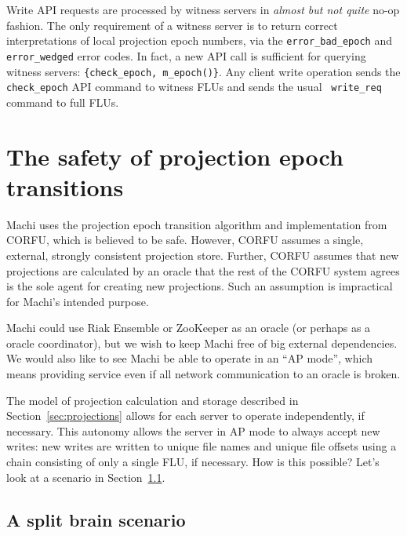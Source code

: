 \documentclass[preprint,10pt]{sigplanconf}
\begin{document}
Write API requests are processed by witness servers in {\em almost but
  not quite} no-op fashion.  The only requirement of a witness server
is to return correct interpretations of local projection epoch
numbers, via the {\tt error\_bad\_epoch} and {\tt error\_wedged} error
codes.  In fact, a new API call is sufficient for querying witness
servers: {\tt \{check\_epoch, m\_epoch()\}}.
Any client write operation sends the {\tt
  check\_\-epoch} API command to witness FLUs and sends the usual {\tt
  write\_\-req} command to full FLUs.

\section{The safety of projection epoch transitions}
\label{sec:safety-of-transitions}

Machi uses the projection epoch transition algorithm and
implementation from CORFU, which is believed to be safe.  However,
CORFU assumes a single, external, strongly consistent projection
store.  Further, CORFU assumes that new projections are calculated by
an oracle that the rest of the CORFU system agrees is the sole agent
for creating new projections.  Such an assumption is impractical for
Machi's intended purpose.

Machi could use Riak Ensemble or ZooKeeper as an oracle (or perhaps as a oracle
coordinator), but we wish to keep Machi free of big external
dependencies.  We would also like to see Machi be able to
operate in an ``AP mode'', which means providing service even
if all network communication to an oracle is broken.

The model of projection calculation and storage described in
Section~\ref{sec:projections} allows for each server to operate
independently, if necessary.  This autonomy allows the server in AP
mode to
always accept new writes: new writes are written to unique file names
and unique file offsets using a chain consisting of only a single FLU,
if necessary.  How is this possible?  Let's look at a scenario in
Section~\ref{sub:split-brain-scenario}.

\subsection{A split brain scenario}
\label{sub:split-brain-scenario}
\end{document}

